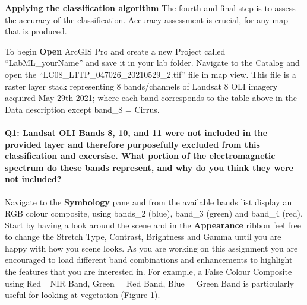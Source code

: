 \documentclass[
]{book}
\begin{document}
\textbf{Applying the classification algorithm}-The fourth and final step is to assess the accuracy of the classification. Accuracy assessment is crucial, for any map that is produced.

To begin \textbf{Open} ArcGIS Pro and create a new Project called ``LabML\_yourName'' and save it in your lab folder. Navigate to the Catalog and open the ``LC08\_L1TP\_047026\_20210529\_2.tif'' file in map view. This file is a raster layer stack representing 8 bands/channels of Landsat 8 OLI imagery acquired May 29th 2021; where each band corresponds to the table above in the Data description except band\_8 = Cirrus.

\hypertarget{q1-landsat-oli-bands-8-10-and-11-were-not-included-in-the-provided-layer-and-therefore-purposefully-excluded-from-this-classification-and-excersise.-what-portion-of-the-electromagnetic-spectrum-do-these-bands-represent-and-why-do-you-think-they-were-not-included}{%
\paragraph*{Q1: Landsat OLI Bands 8, 10, and 11 were not included in the provided layer and therefore purposefully excluded from this classification and excersise. What portion of the electromagnetic spectrum do these bands represent, and why do you think they were not included?}\label{q1-landsat-oli-bands-8-10-and-11-were-not-included-in-the-provided-layer-and-therefore-purposefully-excluded-from-this-classification-and-excersise.-what-portion-of-the-electromagnetic-spectrum-do-these-bands-represent-and-why-do-you-think-they-were-not-included}}

Navigate to the \textbf{Symbology} pane and from the available bands list display an RGB colour composite, using bands\_2 (blue), band\_3 (green) and band\_4 (red). Start by having a look around the scene and in the \textbf{Appearance} ribbon feel free to change the Stretch Type, Contrast, Brightness and Gamma until you are happy with how you scene looks. As you are working on this assignment you are encouraged to load different band combinations and enhancements to highlight the features that you are interested in. For example, a False Colour Composite using Red= NIR Band, Green = Red Band, Blue = Green Band is particularly useful for looking at vegetation (Figure 1).
\end{document}
